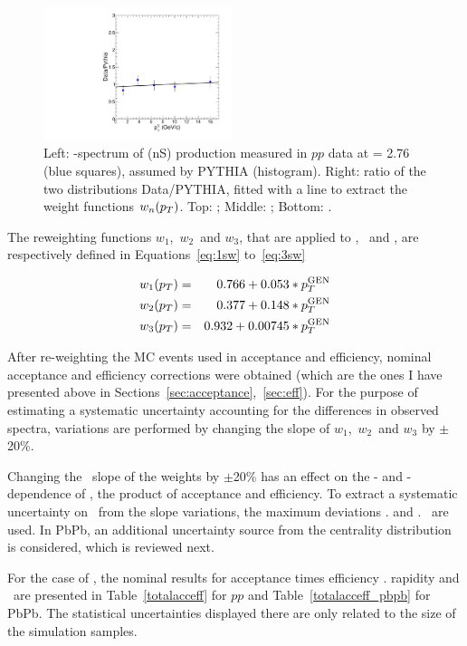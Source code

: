 \begin{figure}
\begin{centering}
  \includegraphics[width=0.49\textwidth]{Chapters/aCorrection/RaY3Spt.pdf}
  \caption{Left: \pt-spectrum of \PgU(nS) production measured in $pp$
    data at \s = 2.76 \TeV (blue
    squares), assumed by PYTHIA (histogram). Right: ratio of the two
    distributions Data/PYTHIA, fitted with a line to extract the
    weight functions $w_{n}(p_{T})$.
    Top: \PgUa; Middle: \PgUb; Bottom: \PgUc.}
  \label{fig:pythia_data} 
\end{centering}  
\end{figure}

The reweighting functions $w_1$,~$w_2$~and $w_3$, that are applied to
\PgUa, \PgUb\ and \PgUc, are respectively defined in
Equations~\ref{eq:1sw} to~\ref{eq:3sw}

\begin{eqnarray}
\label{eq:1sw}
w_1(p_{T}) &=& 0.766 + 0.053*p_T^{\textrm{GEN}}  \\ 
\label{eq:2sw}
w_2(p_{T}) &=& 0.377 + 0.148*p_T^{\textrm{GEN}}   \\
\label{eq:3sw}
w_3(p_{T}) &=& 0.932 + 0.00745*p_T^{\textrm{GEN}} 
\end{eqnarray}

After re-weighting the MC events used in acceptance and efficiency,
nominal acceptance and efficiency corrections were obtained (which are the ones I have presented above in
Sections~\ref{sec:acceptance},~\ref{sec:eff}). For the purpose of
estimating a systematic uncertainty accounting for the differences in
observed spectra, variations are performed by changing the slope
of $w_1$,~$w_2$~and $w_3$ by $\pm$20\%.

Changing the \pt\ slope of the weights by $\pm$20\% has an effect on the
\pt- and \y-dependence of \acc\eff, the product of acceptance and efficiency. To
extract a systematic uncertainty on \acc\eff\ from the slope variations, the maximum
deviations \vs. \pt and \vs. \y\ are used. %
In PbPb, an additional uncertainty source from the centrality
distribution is considered, which is reviewed next.

For the case of \PgUa, the nominal results for acceptance times
efficiency \vs. rapidity and \pt\ are presented in
Table~\ref{totalacceff} for $pp$ and Table~\ref{totalacceff_pbpb} for
PbPb. The statistical uncertainties displayed there are only related
to the size of the simulation samples. 


